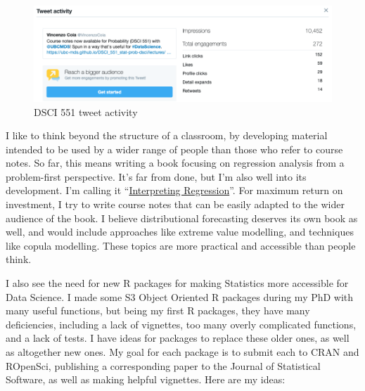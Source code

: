 \documentclass[]{article}
\begin{document}
\begin{figure}
\centering
\includegraphics{./img/551_tweet.png}
\caption{DSCI 551 tweet activity}
\end{figure}

I like to think beyond the structure of a classroom, by developing material intended to be used by a wider range of people than those who refer to course notes. So far, this means writing a book focusing on regression analysis from a problem-first perspective. It's far from done, but I'm also well into its development. I'm calling it ``\href{https://interpreting-regression.netlify.com/}{Interpreting Regression}''. For maximum return on investment, I try to write course notes that can be easily adapted to the wider audience of the book. I believe distributional forecasting deserves its own book as well, and would include approaches like extreme value modelling, and techniques like copula modelling. These topics are more practical and accessible than people think.

I also see the need for new R packages for making Statistics more accessible for Data Science. I made some S3 Object Oriented R packages during my PhD with many useful functions, but being my first R packages, they have many deficiencies, including a lack of vignettes, too many overly complicated functions, and a lack of tests. I have ideas for packages to replace these older ones, as well as altogether new ones. My goal for each package is to submit each to CRAN and ROpenSci, publishing a corresponding paper to the Journal of Statistical Software, as well as making helpful vignettes. Here are my ideas:
\end{document}
